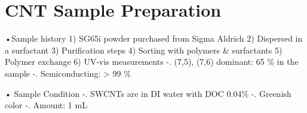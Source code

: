 \label{AppendixA}
\section{CNT Sample Preparation }
•Sample history
1) SG65i powder purchased from Sigma Aldrich
2) Dispersed in a surfactant
3) Purification steps
4) Sorting with polymers \& surfactants
5) Polymer exchange
6) UV-vis measurements
-. (7,5), (7,6) dominant: 65 \% in the sample
-. Semiconducting: > 99 \%

• Sample Condition
-. SWCNTs are in DI water with DOC 0.04\%
-. Greenish color
-. Amount: 1 mL
